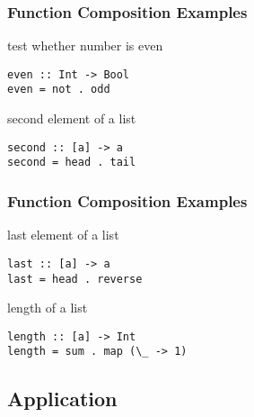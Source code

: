 \documentclass[dvipsnames]{beamer}
\theoremstyle{plain}
\begin{document}
\begin{frame}[fragile]
  \frametitle{Function Composition Examples}

  \begin{exampleblock}{test whether number is even}
    \begin{lstlisting}[deletekeywords=even]
even :: Int -> Bool
even = not . odd
    \end{lstlisting}
  \end{exampleblock}

  \pause
  \begin{exampleblock}{second element of a list}
    \begin{lstlisting}
second :: [a] -> a
second = head . tail
    \end{lstlisting}
  \end{exampleblock}
\end{frame}

\begin{frame}[fragile]
  \frametitle{Function Composition Examples}

  \begin{exampleblock}{last element of a list}
    \begin{lstlisting}[deletekeywords=last]
last :: [a] -> a
last = head . reverse
    \end{lstlisting}
  \end{exampleblock}

  \pause
  \begin{exampleblock}{length of a list}
    \begin{lstlisting}[deletekeywords=length]
length :: [a] -> Int
length = sum . map (\_ -> 1)
    \end{lstlisting}
  \end{exampleblock}
\end{frame}

\subsection{Application}
\end{document}
